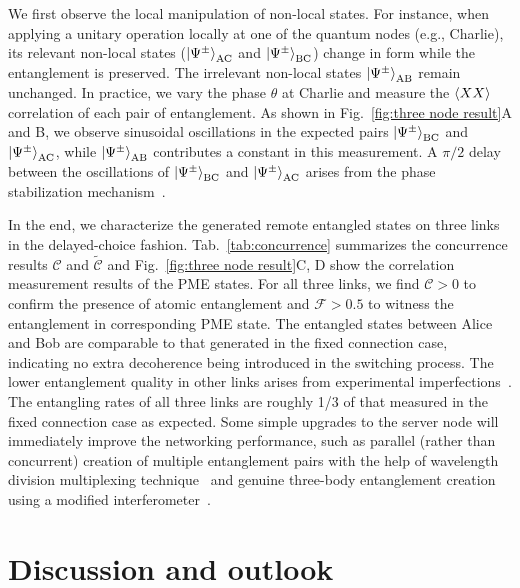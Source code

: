 \documentclass[aps,reprint,showpacs,superscriptaddress]{revtex4-2}
\begin{document}
We first observe the local manipulation of non-local states. For instance, when applying a unitary operation locally at one of the quantum nodes (e.g., Charlie), its relevant non-local states ($\ket{\Psi^{\pm}}_{\text{AC}}$ and $\ket{\Psi^{\pm}}_{\text{BC}}$) change in form while the entanglement is preserved. The irrelevant non-local states $\ket{\Psi^{\pm}}_{\textrm{AB}}$ remain unchanged. In practice, we vary the phase $\theta$ at Charlie and measure the $\braket{XX}$ correlation of each pair of entanglement. As shown in Fig.~\ref{fig:three node result}A and B, we observe sinusoidal oscillations in the expected pairs $\ket{\Psi^{\pm}}_{\text{BC}}$ and $\ket{\Psi^{\pm}}_{\text{AC}}$, while $\ket{\Psi^{\pm}}_{\text{AB}}$ contributes a constant in this measurement. A $\pi/2$ delay between the oscillations of $\ket{\Psi^{\pm}}_{\text{BC}}$ and $\ket{\Psi^{\pm}}_{\text{AC}}$ arises from the phase stabilization mechanism~\cite{SM}.

In the end, we characterize the generated remote entangled states on three links in the delayed-choice fashion. Tab.~\ref{tab:concurrence} summarizes the concurrence results $\mathcal{C}$ and $\mathcal{\tilde{C}}$ and Fig.~\ref{fig:three node result}C, D show the correlation measurement results of the PME states. For all three links, we find $\mathcal{C}>0$ to confirm the presence of atomic entanglement and $\mathcal{F}>0.5$ to witness the entanglement in corresponding PME state. The entangled states between Alice and Bob are comparable to that generated in the fixed connection case, indicating no extra decoherence being introduced in the switching process. The lower entanglement quality in other links arises from experimental imperfections~\cite{SM}. The entangling rates of all three links are roughly 1/3 of that measured in the fixed connection case as expected. Some simple upgrades to the server node will immediately improve the networking performance, such as parallel (rather than concurrent) creation of multiple entanglement pairs with the help of wavelength division multiplexing technique~\cite{wengerowsky2018} and genuine three-body entanglement creation using a modified interferometer~\cite{choi2010,jing2019,dur2000}.


\section*{Discussion and outlook}
\end{document}
